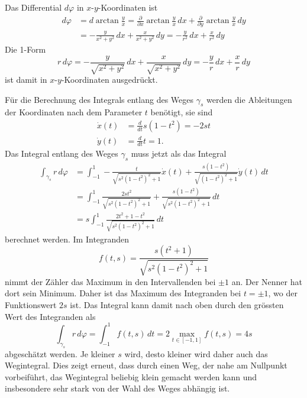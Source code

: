 \begin{beispiel}
Das Differential $d\varphi$ in $x$-$y$-Koordinaten ist
\begin{align*}
d\varphi
&=
d\arctan\frac{y}{x}
=
\frac{\partial}{\partial x}\arctan\frac{y}{x}\,dx
+
\frac{\partial}{\partial y}\arctan\frac{y}{x}\,dy
\\
&=
-\frac{y}{x^2+y^2}\,dx
+
\frac{x}{x^2+y^2}\,dy
=
-\frac{y}{r^2}\,dx
+
\frac{x}{r^2}\,dy
\end{align*}
Die 1-Form
\[
r\,d\varphi
=
-\frac{y}{\sqrt{x^2+y^2}}\,dx
+
\frac{x}{\sqrt{x^2+y^2}}\,dy
=
-\frac{y}{r}\,dx
+
\frac{x}{r}\,dy
\]
ist damit in $x$-$y$-Koordinaten ausgedrückt.

Für die Berechnung des Integrals entlang des Weges $\gamma_s$ werden
die Ableitungen der Koordinaten nach dem Parameter $t$ benötigt, sie
sind
\begin{align*}
\dot{x}(t) &= \frac{d}{dt} s(1-t^2) = -2st \\
\dot{y}(t) &= \frac{d}{dt} t = 1.
\end{align*}
Das Integral entlang des Weges $\gamma_s$ muss jetzt als das Integral
\begin{align*}
\int_{\gamma_s} r\,d\varphi
&=
\int_{-1}^1
-\frac{t}{\sqrt{s^2(1-t^2)^2+1}} \dot{x}(t)
+\frac{s(1-t^2)}{\sqrt{(1-t^2)^2+1}} \dot{y}(t)
\,dt
\\
&=
\int_{-1}^1
\frac{2st^2}{\sqrt{s^2(1-t^2)^2+1}} 
+\frac{s(1-t^2)}{\sqrt{s^2(1-t^2)^2+1}}
\,dt
\\
&=
s\int_{-1}^1
\frac{2t^2+1-t^2}{\sqrt{s^2(1-t^2)^2+1}}
\,dt
\end{align*}
berechnet werden.
Im Integranden
\[
f(t,s)
=
\frac{s(t^2+1)}{\sqrt{s^2(1-t^2)^2+1}}
\]
nimmt der Zähler das Maximum in den Intervallenden bei $\pm 1$ an.
Der Nenner hat dort sein Minimum.
Daher ist das Maximum des Integranden bei $t=\pm1$, wo der Funktionswert
$2s$ ist.
Das Integral kann damit nach oben durch den grössten
Wert des Integranden als
\[
\int_{\gamma_s} r\,d\varphi
=
\int_{-1}^1 f(t,s)\,dt
=
2 \max_{t\in[-1,1]} f(t,s)
=
4s
\]
abgeschätzt werden.
Je kleiner $s$ wird, desto kleiner wird daher auch das Wegintegral.
Dies zeigt erneut, dass durch einen Weg, der nahe am Nullpunkt vorbeiführt,
das Wegintegral beliebig klein gemacht werden kann und insbesondere
sehr stark von der Wahl des Weges abhängig ist.
\end{beispiel}

%
%
